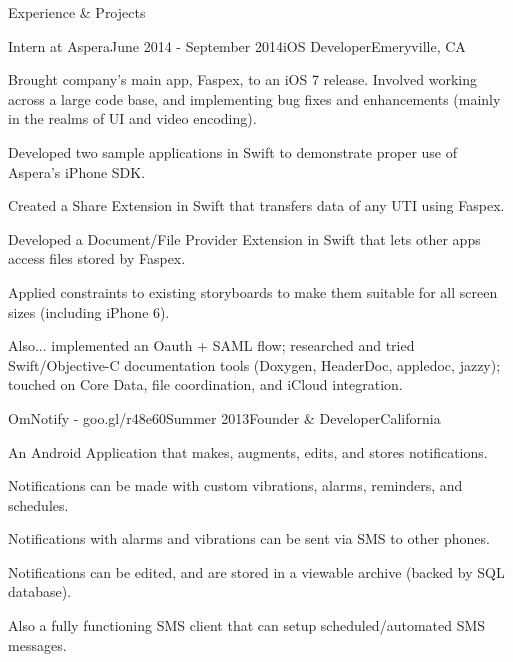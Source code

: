 \documentclass{resume} %
\begin{document}

\begin{rSection}{Experience \& Projects}

\begin{rSubsection}{Intern at Aspera}{June 2014 - September 2014}{iOS Developer}{Emeryville, CA}
\item Brought company's main app, Faspex, to an iOS 7 release. Involved working across
    a large code base, and implementing bug fixes and enhancements (mainly in the
    realms of UI and video encoding).
\item Developed two sample applications in Swift to demonstrate proper use of Aspera's iPhone
    SDK.
\item Created a Share Extension in Swift that transfers data of any UTI using Faspex.
\item Developed a Document/File Provider Extension in Swift that
    lets other apps access files stored by Faspex.
\item Applied constraints to existing storyboards to make them suitable for all
    screen sizes (including iPhone 6).
\item Also... implemented an Oauth + SAML flow; researched and tried Swift/Objective-C
    documentation tools (Doxygen, HeaderDoc, appledoc, jazzy); touched on Core Data, file
    coordination, and iCloud integration.
\end{rSubsection}


\begin{rSubsection}{OmNotify - goo.gl/r48e60}{Summer 2013}{Founder \& Developer}{California}
\item An Android Application that makes, augments, edits, and stores notifications.
\item Notifications can be made with custom vibrations, alarms, reminders, and schedules.
\item Notifications with alarms and vibrations can be sent via SMS to other phones.
\item Notifications can be edited, and are stored in a viewable archive (backed by
    SQL database).
\item Also a fully functioning SMS client that can setup scheduled/automated SMS messages.


\end{rSubsection}
\end{rSection}
\end{document}
